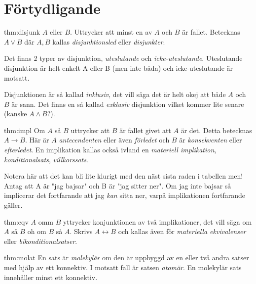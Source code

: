 \section{Förtydligande}

\begin{theo}[Disjunktion]{thm:disjunk}
  $A$ eller $B$. Uttrycker att minst en av $A$ och $B$ är fallet. Betecknas $A\vee B$ där $A, B$ kallas \textit{disjunktionsled} eller \textit{disjunkter}.
  \par\bigskip
  \noindent Det finns 2 typer av disjunktion, \textit{uteslutande} och \textit{icke-uteslutande}. Uteslutande disjunktion är helt enkelt A eller B (men inte båda) och icke-uteslutande är motsatt.
\end{theo}
\par\bigskip

\noindent Disjunktionen är så kallad \textit{inklusiv}, det vill säga det är helt okej att både $A$ och $B$ är sann. Det finns en så kallad \textit{exklusiv} disjunktion vilket kommer lite senare (kanske $A\wedge B$?). 
\par\bigskip

\begin{theo}[Implikation]{thm:impl}
  Om $A$ så $B$ uttrycker att $B$ är fallet givet att $A$ är det. Detta betecknas $A\rightarrow B$. Här är $A$ \textit{antecendenten} eller även \textit{förledet} och $B$ är \textit{konsekventen} eller \textit{efterledet}. En implikation kallas också ivland en \textit{materiell implikation}, \textit{konditionalsats}, \textit{villkorssats}.
\end{theo}
\par\bigskip

\noindent Notera här att det kan bli lite klurigt med den näst sista raden i tabellen men! Antag att A är "jag bajsar" och B är "jag sitter ner". Om jag inte bajsar så implicerar det fortfarande att jag \textit{kan} sitta ner, varpå implikationen fortfarande gäller.

\begin{theo}[Ekvivalens]{thm:eqv}
  $A$ omm $B$ yttrycker konjunktionen av två implikationer, det vill säga om $A$ så $B$ oh om $B$ så $A$. Skrivs $A\leftrightarrow B$ och kallas även för \textit{materiella ekvivalenser} eller \textit{bikonditionalsatser}.
\end{theo}
\par\bigskip

\begin{theo}{thm:molat}
  En sats är \textit{molekylär} om den är uppbyggd av en eller två andra satser med hjälp av ett konnektiv. I motsatt fall är satsen \textit{atomär}. En molekylär sats innehåller minst ett konnektiv.
\end{theo}
\par\bigskip

